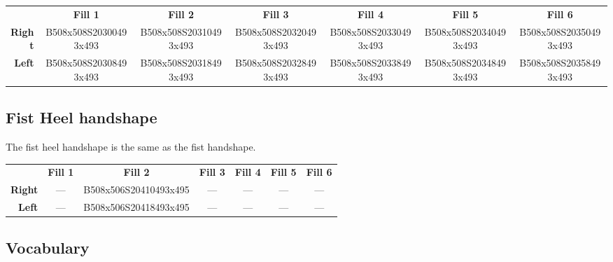 \documentclass{article}
\begin{document}
\begin{center}
\begin{tabular}{r*{6}{c}}
&\textbf{Fill 1}&\textbf{Fill 2}&\textbf{Fill 3}&\textbf{Fill 4}&\textbf{Fill 5}&\textbf{Fill 6}\\
\textbf{Right}&
B508x508S20300493x493&
B508x508S20310493x493&
B508x508S20320493x493&
B508x508S20330493x493&
B508x508S20340493x493&
B508x508S20350493x493\\
\textbf{Left}&
B508x508S20308493x493&
B508x508S20318493x493&
B508x508S20328493x493&
B508x508S20338493x493&
B508x508S20348493x493&
B508x508S20358493x493\\
\end{tabular}
\end{center}

\subsection{Fist Heel handshape}

The fist heel handshape is the same as the fist handshape.

\begin{center}
\begin{tabular}{r*{6}{c}}
&\textbf{Fill 1}&\textbf{Fill 2}&\textbf{Fill 3}&\textbf{Fill 4}&\textbf{Fill 5}&\textbf{Fill 6}\\
\textbf{Right}&
---&
B508x506S20410493x495&
---&
---&
---&
---\\
\textbf{Left}&
---&
B508x506S20418493x495&
---&
---&
---&
---\\
\end{tabular}
\end{center}

\subsection{Vocabulary}
\end{document}

